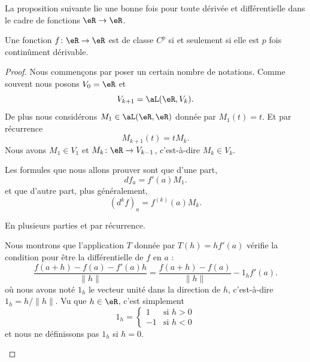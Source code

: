 La proposition suivante lie une bonne fois pour toute dérivée et différentielle dans le cadre de fonctions \( \eR\to \eR\).
\begin{proposition}      \label{PROPooCNDHooKRwils}
	Une fonction \( f\colon \eR\to \eR\) est de classe \( C^p\) si et seulement si elle est \( p\) fois continûment dérivable.
\end{proposition}

\begin{proof}
	Nous commençons par poser un certain nombre de notations. Comme souvent nous posons \( V_0=\eR\) et
	\begin{equation}
		V_{k+1}=\aL(\eR,V_k).
	\end{equation}
	De plus nous considérons \( M_1\in \aL(\eR,\eR)\) donnée par \( M_1(t)=t\). Et par récurrence
	\begin{equation}
		M_{k+1}(t)=tM_{k}.
	\end{equation}
	Nous avons \( M_1\in V_1\) et \( M_k\colon \eR\to V_{k-1}\), c'est-à-dire \( M_k\in V_k\).

	Les formules que nous allons prouver sont que d'une part,
	\begin{equation}
		df_a=f'(a)M_1.
	\end{equation}
	et que d'autre part, plus généralement,
	\begin{equation}
		(d^kf)_a=f^{(k)}(a)M_k.
	\end{equation}

	En plusieurs parties et par récurrence.
	\begin{subproof}
		Nous montrons que l'application \( T\) donnée par \( T(h)=hf'(a)\) vérifie la condition pour être la différentielle de \( f\) en \( a\) :
		\begin{equation}        \label{EQooCPWKooWdgbED}
			\frac{ f(a+h)-f(a)-f'(a)h }{ \| h \| }=\frac{ f(a+h)-f(a) }{ \| h \| }-1_hf'(a).
		\end{equation}
		où nous avons noté \( 1_h\) le vecteur unité dans la direction de \( h\), c'est-à-dire \( 1_h=h/\| h \|\). Vu que \( h\in \eR\), c'est simplement
		\begin{equation}
			1_h=\begin{cases}
				1  & \text{si } h>0 \\
				-1 & \text{si }h<0
			\end{cases}
		\end{equation}
		et nous ne définissons pas \( 1_h\) si \( h=0\).


\end{subproof}
\end{proof}
